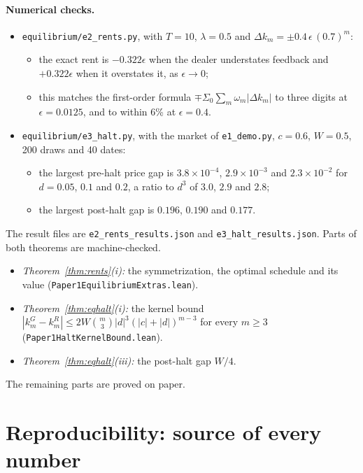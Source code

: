 \paragraph{Numerical checks.}
\begin{itemize}[itemsep=1pt,topsep=2pt]
\item \nolinkurl{equilibrium/e2_rents.py}, with $T=10$, $\lambda=0.5$ and $\Delta k_m=\pm0.4\,\epsilon\,(0.7)^m$:
  \begin{itemize}[itemsep=1pt,topsep=1pt]
  \item the exact rent is $-0.322\epsilon$ when the dealer understates feedback and $+0.322\epsilon$ when it overstates it, as $\epsilon\to0$;
  \item this matches the first-order formula $\mp\Sigma_0\sum_m\omega_m|\Delta k_m|$ to three digits at $\epsilon=0.0125$, and to within 6\% at $\epsilon=0.4$.
  \end{itemize}
\item \nolinkurl{equilibrium/e3_halt.py}, with the market of \nolinkurl{e1_demo.py}, $c=0.6$, $W=0.5$, 200 draws and 40 dates:
  \begin{itemize}[itemsep=1pt,topsep=1pt]
  \item the largest pre-halt price gap is $3.8\times10^{-4}$, $2.9\times10^{-3}$ and $2.3\times10^{-2}$ for $d=0.05$, $0.1$ and $0.2$, a ratio to $d^3$ of $3.0$, $2.9$ and $2.8$;
  \item the largest post-halt gap is $0.196$, $0.190$ and $0.177$.
  \end{itemize}
\end{itemize}
The result files are \nolinkurl{e2_rents_results.json} and \nolinkurl{e3_halt_results.json}. Parts of both theorems are machine-checked.
\begin{itemize}[itemsep=1pt,topsep=2pt]
\item \emph{Theorem~\ref{thm:rents}(i):} the symmetrization, the optimal schedule and its value (\nolinkurl{Paper1EquilibriumExtras.lean}).
\item \emph{Theorem~\ref{thm:eqhalt}(i):} the kernel bound $|k^G_m-k^R_m|\le2W\binom m3|d|^3(|c|+|d|)^{m-3}$ for every $m\ge3$ (\nolinkurl{Paper1HaltKernelBound.lean}).
\item \emph{Theorem~\ref{thm:eqhalt}(iii):} the post-halt gap $W/4$.
\end{itemize}
The remaining parts are proved on paper.



\section{Reproducibility: source of every number}\label{app:repro}

